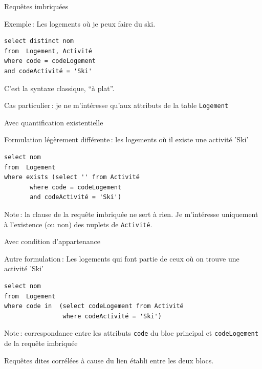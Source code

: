 

\begin{frame}[fragile]{Requêtes imbriquées}


Exemple\,: Les logements où je peux faire du ski.

\vfill

\begin{verbatim}
select distinct nom
from  Logement, Activité
where code = codeLogement
and codeActivité = 'Ski'
\end{verbatim}

\vfill

C'est la syntaxe classique, ``à plat''. 

\vfill

Cas particulier\,: je ne m'intéresse qu'aux attributs de la table
\texttt{Logement}

\end{frame}

\begin{frame}[fragile]{Avec quantification existentielle}

Formulation légèrement différente\,: les logements où \alert{il existe} 
une activité 'Ski'

\vfill

\begin{verbatim}
select nom
from  Logement
where exists (select '' from Activité
       where code = codeLogement
       and codeActivité = 'Ski')
\end{verbatim}

\vfill

Note\,: la clause  de
la requête imbriquée ne sert à rien. Je m'intéresse 
 uniquement à l'existence
(ou non) des nuplets de \texttt{Activité}.
\end{frame}

\begin{frame}[fragile]{Avec condition d'appartenance}

Autre formulation\,:
Les logements qui font partie de ceux où on trouve une activité 'Ski'

\vfill

\begin{verbatim}
select nom
from  Logement
where code in  (select codeLogement from Activité
                where codeActivité = 'Ski')
\end{verbatim}

\vfill

Note\,: correspondance entre les attributs \texttt{code}
du bloc principal et \texttt{codeLogement} de
la requête imbriquée

\vfill
\alert{Requêtes dites corrélées} à cause
du lien établi entre les deux blocs.
\end{frame}


